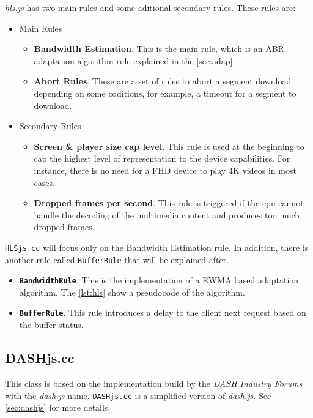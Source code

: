 \textit{hls.js} has two main rules and some aditional secondary rules. These rules are:
\begin{itemize}[noitemsep, topsep=0pt]
  \item Main Rules
  \begin{itemize}[noitemsep, topsep=0pt]
    \item \textbf{Bandwidth Estimation}. This is the main rule, which is an ABR adaptation
    algorithm rule explained in the \autoref{sec:adap}.
    \item \textbf{Abort Rules}. These are a set of rules to abort a segment download depending on
    some coditions, for example, a timeout for a segment to download.
  \end{itemize}
  \item Secondary Rules
  \begin{itemize}[noitemsep, topsep=0pt]
    \item \textbf{Screen \& player size cap level}. This rule is used at the beginning to cap the highest
    level of representation to the device capabilities. For instance, there is no need for a FHD
    device to play 4K videos in most cases.
    \item \textbf{Dropped frames per second}. This rule is triggered if the cpu cannot handle the 
    decoding of the multimedia content and produces too much dropped frames.
  \end{itemize}
\end{itemize}

\texttt{HLSjs.cc} will focus only on the Bandwidth Estimation rule. In addition, there is another 
rule called \texttt{BufferRule} that will be explained after.

\begin{itemize}
  \item \textbf{\texttt{BandwidthRule}}. This is the implementation of a EWMA based adaptation
  algorithm. The \autoref{lst:hls} show a pseudocode of the algorithm.
  \item \textbf{\texttt{BufferRule}}. This rule introduces a delay to the client
  next request based on the buffer status.
\end{itemize}

\subsection{DASHjs.cc}
This class is based on the implementation build by the \textit{DASH Industry Forums} with the \textit{dash.js}
name. \texttt{DASHjs.cc} is a simplified version of \textit{dash.js}. See \autoref{sec:dashjs} for more details.

